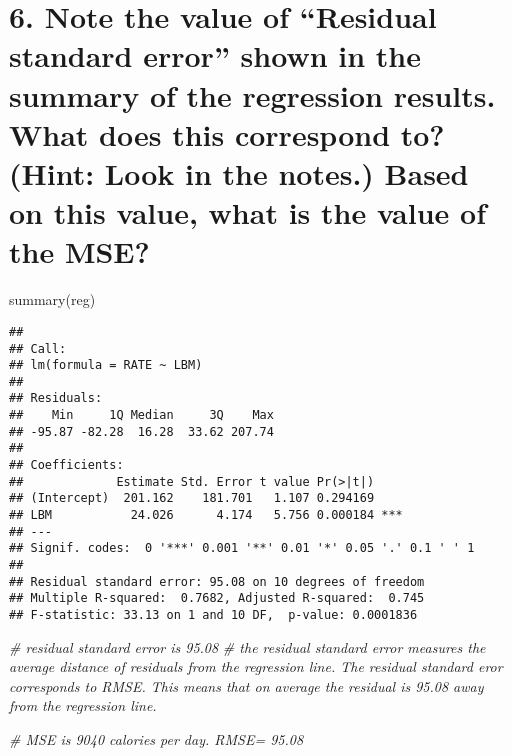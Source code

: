 \documentclass[
]{article}
\newenvironment{Shaded}{\begin{snugshade}}{\end{snugshade}}
\newcommand{\CommentTok}[1]{\textcolor[rgb]{0.56,0.35,0.01}{\textit{#1}}}
\newcommand{\FunctionTok}[1]{\textcolor[rgb]{0.00,0.00,0.00}{#1}}
\newcommand{\NormalTok}[1]{#1}
\begin{document}
\hypertarget{note-the-value-of-residual-standard-error-shown-in-the-summary-of-the-regression-results.-what-does-this-correspond-to-hint-look-in-the-notes.-based-on-this-value-what-is-the-value-of-the-mse}{%
\section{6. Note the value of ``Residual standard error'' shown in the
summary of the regression results. What does this correspond to? (Hint:
Look in the notes.) Based on this value, what is the value of the
MSE?}\label{note-the-value-of-residual-standard-error-shown-in-the-summary-of-the-regression-results.-what-does-this-correspond-to-hint-look-in-the-notes.-based-on-this-value-what-is-the-value-of-the-mse}}

\begin{Shaded}
\begin{Highlighting}[]
\FunctionTok{summary}\NormalTok{(reg)}
\end{Highlighting}
\end{Shaded}

\begin{verbatim}
## 
## Call:
## lm(formula = RATE ~ LBM)
## 
## Residuals:
##    Min     1Q Median     3Q    Max 
## -95.87 -82.28  16.28  33.62 207.74 
## 
## Coefficients:
##             Estimate Std. Error t value Pr(>|t|)    
## (Intercept)  201.162    181.701   1.107 0.294169    
## LBM           24.026      4.174   5.756 0.000184 ***
## ---
## Signif. codes:  0 '***' 0.001 '**' 0.01 '*' 0.05 '.' 0.1 ' ' 1
## 
## Residual standard error: 95.08 on 10 degrees of freedom
## Multiple R-squared:  0.7682, Adjusted R-squared:  0.745 
## F-statistic: 33.13 on 1 and 10 DF,  p-value: 0.0001836
\end{verbatim}

\begin{Shaded}
\begin{Highlighting}[]
\CommentTok{\# residual standard error is 95.08}
\CommentTok{\# the residual standard error measures the average distance of residuals from the regression line. The residual standard eror corresponds to RMSE. This means that on average the residual is 95.08 away from the regression line. }

\CommentTok{\# MSE is 9040 calories per day. RMSE= 95.08}
\end{Highlighting}
\end{Shaded}
\end{document}
